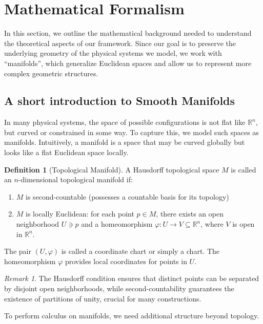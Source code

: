 \documentclass{article}
\theoremstyle{plain}
\theoremstyle{definition}
\newtheorem{definition}[theorem]{Definition}
\theoremstyle{remark}
\newtheorem{remark}[theorem]{Remark}
\newcommand{\R}{\mathbb{R}}
\begin{document}

 
\newpage
\appendix
\section{Mathematical Formalism}

In this section, we outline the mathematical background needed to understand the theoretical aspects of our framework. Since our goal is to preserve the underlying geometry of the physical systems we model, we work with ``manifolds'', which generalize Euclidean spaces and allow us to represent more complex geometric structures.

\subsection{A short introduction to Smooth Manifolds}
In many physical systems, the space of possible configurations is not flat like $\mathbb{R}^n$, but curved or constrained in some way. To capture this, we model such spaces as manifolds. Intuitively, a manifold is a space that may be curved globally but looks like a flat Euclidean space locally.

\begin{definition}[Topological Manifold]
A Hausdorff topological space $M$ is called an $n$-dimensional topological manifold if:
\begin{enumerate}
\item $M$ is second-countable (possesses a countable basis for its topology)
\item $M$ is locally Euclidean: for each point $p \in M$, there exists an open neighborhood $U \ni p$ and a homeomorphism $\varphi: U \to V \subseteq \R^n$, where $V$ is open in $\R^n$.
\end{enumerate}

The pair $(U, \varphi)$ is called a coordinate chart or simply a chart. The homeomorphism $\varphi$ provides local coordinates for points in $U$.
\end{definition}

\begin{remark}
The Hausdorff condition ensures that distinct points can be separated by disjoint open neighborhoods, while second-countability guarantees the existence of partitions of unity, crucial for many constructions.
\end{remark}


To perform calculus on manifolds, we need additional structure beyond topology.
\end{document}
